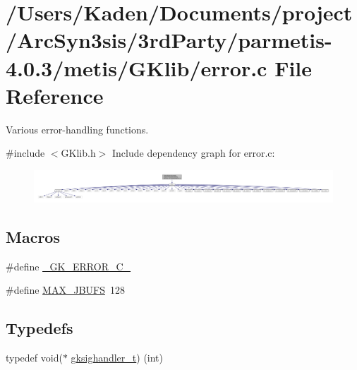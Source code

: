 \hypertarget{a00026}{}\section{/\+Users/\+Kaden/\+Documents/project/\+Arc\+Syn3sis/3rd\+Party/parmetis-\/4.0.3/metis/\+G\+Klib/error.c File Reference}
\label{a00026}


Various error-\/handling functions.  


{\ttfamily \#include $<$G\+Klib.\+h$>$}\newline
Include dependency graph for error.\+c\+:\nopagebreak
\begin{figure}[H]
\begin{center}
\leavevmode
\includegraphics[width=350pt]{a00027}
\end{center}
\end{figure}
\subsection*{Macros}
\begin{DoxyCompactItemize}
\item 
\#define \hyperlink{a00026_a8bb7cbc945cda2535b28210143678592}{\+\_\+\+G\+K\+\_\+\+E\+R\+R\+O\+R\+\_\+\+C\+\_\+}
\item 
\#define \hyperlink{a00026_aef49b1cc9e8eb8a2875e26ed0d87a4e6}{M\+A\+X\+\_\+\+J\+B\+U\+FS}~128
\end{DoxyCompactItemize}
\subsection*{Typedefs}
\begin{DoxyCompactItemize}
\item 
typedef void($\ast$ \hyperlink{a00026_a783dab350e64ba521c464f693c54c33e}{gksighandler\+\_\+t}) (int)
\end{DoxyCompactItemize}
